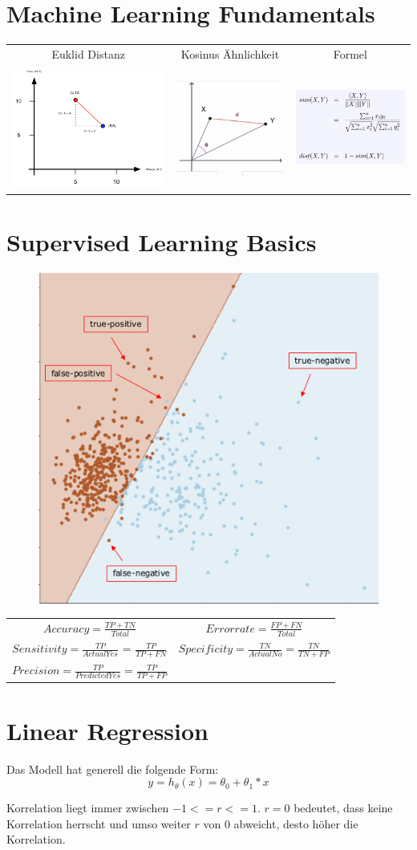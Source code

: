\documentclass{article}
\begin{document}
\section{Machine Learning Fundamentals}
	\begin{tabular}{c c c}
	  Euklid Distanz & Kosinus Ähnlichkeit & Formel\\
    	  \includegraphics[width=0.25\linewidth]{euclide_distance.png} & \includegraphics[width=0.25\linewidth]{cosine_similarity.png} & \includegraphics[width=0.25\linewidth]{cosine_similarity_formula.png} \\
	\end{tabular}
\section{Supervised Learning Basics}
\begin{figure}[H]
	\includegraphics[width=0.5\linewidth]{true_positive}
\end{figure}
\begin{tabular}{c c}
	$Accuracy = \frac{TP + TN}{Total}$ & 	$Errorrate = \frac{FP + FN}{Total}$ \\
	$Sensitivity = \frac{TP}{Actual Yes}$ = $\frac{TP}{TP + FN}$ & $Specificity = \frac{TN}{ActualNo} = \frac{TN}{TN + FP}$ \\
	$Precision = \frac{TP}{Predicted Yes} = \frac{TP}{TP + FP}$
\end{tabular}
\section{Linear Regression}
	Das Modell hat generell die folgende Form:
	$$y = h_\theta(x) = \theta_0 + \theta_1 * x$$

	Korrelation liegt immer zwischen $-1 <= r <= 1$.
	$r = 0$ bedeutet, dass keine Korrelation herrscht und umso weiter $r$ von $0$ abweicht, 
	desto höher die Korrelation.
\end{document}
